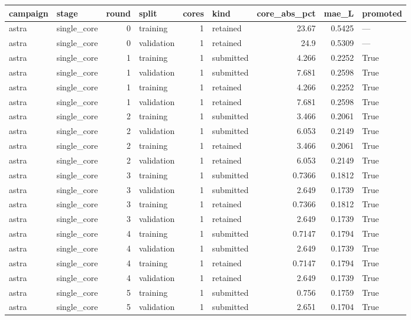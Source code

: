 \begin{tabular}{llrlrlrrl}
\toprule
campaign & stage & round & split & cores & kind & core\_abs\_pct & mae\_L & promoted \\
\midrule
astra & single\_core & 0 & training & 1 & retained & 23.67 & 0.5425 & — \\
astra & single\_core & 0 & validation & 1 & retained & 24.9 & 0.5309 & — \\
astra & single\_core & 1 & training & 1 & submitted & 4.266 & 0.2252 & True \\
astra & single\_core & 1 & validation & 1 & submitted & 7.681 & 0.2598 & True \\
astra & single\_core & 1 & training & 1 & retained & 4.266 & 0.2252 & True \\
astra & single\_core & 1 & validation & 1 & retained & 7.681 & 0.2598 & True \\
astra & single\_core & 2 & training & 1 & submitted & 3.466 & 0.2061 & True \\
astra & single\_core & 2 & validation & 1 & submitted & 6.053 & 0.2149 & True \\
astra & single\_core & 2 & training & 1 & retained & 3.466 & 0.2061 & True \\
astra & single\_core & 2 & validation & 1 & retained & 6.053 & 0.2149 & True \\
astra & single\_core & 3 & training & 1 & submitted & 0.7366 & 0.1812 & True \\
astra & single\_core & 3 & validation & 1 & submitted & 2.649 & 0.1739 & True \\
astra & single\_core & 3 & training & 1 & retained & 0.7366 & 0.1812 & True \\
astra & single\_core & 3 & validation & 1 & retained & 2.649 & 0.1739 & True \\
astra & single\_core & 4 & training & 1 & submitted & 0.7147 & 0.1794 & True \\
astra & single\_core & 4 & validation & 1 & submitted & 2.649 & 0.1739 & True \\
astra & single\_core & 4 & training & 1 & retained & 0.7147 & 0.1794 & True \\
astra & single\_core & 4 & validation & 1 & retained & 2.649 & 0.1739 & True \\
astra & single\_core & 5 & training & 1 & submitted & 0.756 & 0.1759 & True \\
astra & single\_core & 5 & validation & 1 & submitted & 2.651 & 0.1704 & True \\

\end{tabular}
